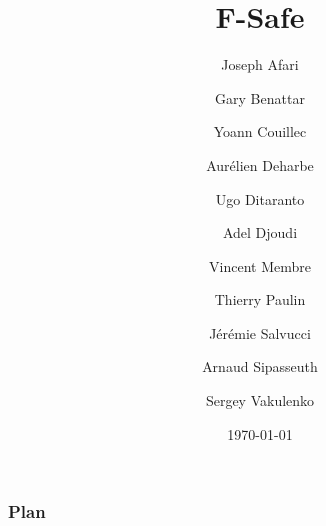 \documentclass{beamer}
\begin{document}
 
\title{F-Safe}
\author[La FSafe team]{
	Joseph Afari \and 
	Gary Benattar \and
	Yoann Couillec \and
 	Aurélien Deharbe \and
	Ugo Ditaranto \and
	Adel Djoudi \and
	Vincent Membre \and
	Thierry Paulin \and
	Jérémie Salvucci \and
	Arnaud Sipasseuth \and
	Sergey Vakulenko}
\date{\today} 


\begin{frame}
  \titlepage
\end{frame}

\begin{frame}
  \frametitle{Plan}
\end{frame} 






\end{document}
